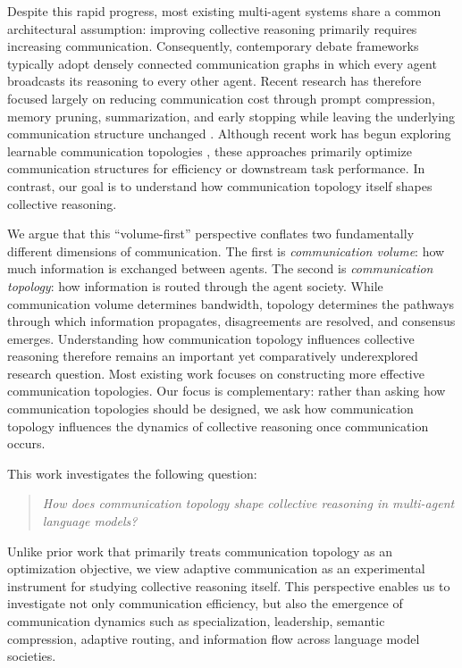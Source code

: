 \documentclass[11pt]{article}
\begin{document}
Despite this rapid progress, most existing multi-agent systems share a common architectural assumption: improving collective reasoning primarily requires increasing communication. Consequently, contemporary debate frameworks typically adopt densely connected communication graphs in which every agent broadcasts its reasoning to every other agent. Recent research has therefore focused largely on reducing communication cost through prompt compression, memory pruning, summarization, and early stopping while leaving the underlying communication structure unchanged \citep{zhang2025cut,wang-etal-2025-agentdropout}. Although recent work has begun exploring learnable communication topologies
\citep{
zhang2025gdesigner,
shen-etal-2025-understanding},
these approaches primarily optimize communication structures for efficiency or downstream task performance. In contrast, our goal is to understand how communication topology itself shapes collective reasoning.

We argue that this ``volume-first'' perspective conflates two fundamentally different dimensions of communication. The first is \emph{communication volume}: how much information is exchanged between agents. The second is \emph{communication topology}: how information is routed through the agent society. While communication volume determines bandwidth, topology determines the pathways through which information propagates, disagreements are resolved, and consensus emerges. Understanding how communication topology influences collective reasoning therefore remains an important yet comparatively underexplored research question.
Most existing work focuses on constructing more effective communication topologies. Our focus is complementary: rather than asking how communication topologies should be designed, we ask how communication topology influences the dynamics of collective reasoning once communication occurs.

This work investigates the following question:

\begin{quote}
\emph{How does communication topology shape collective reasoning in multi-agent language models?}
\end{quote}
Unlike prior work that primarily treats communication topology as an optimization objective, we view adaptive communication as an experimental instrument for studying collective reasoning itself. This perspective enables us to investigate not only communication efficiency, but also the emergence of communication dynamics such as specialization, leadership, semantic compression, adaptive routing, and information flow across language model societies.
\end{document}
